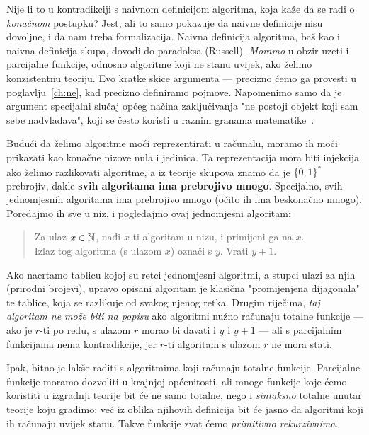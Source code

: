\begin{napomena}[{name=[Russellov paradoks s totalnim algoritmima]}]\label{nap:diagtot}
	Nije li to u kontradikciji s naivnom definicijom algoritma, koja kaže da se radi o \emph{konačnom} postupku? Jest, ali to samo pokazuje da naivne definicije nisu dovoljne, i da nam treba formalizacija. Naivna definicija algoritma, baš kao i naivna definicija skupa, dovodi do paradoksa (Russell). \emph{Moramo} u obzir uzeti i parcijalne funkcije, odnosno algoritme koji ne stanu uvijek, ako želimo konzistentnu teoriju. Evo kratke skice argumenta --- precizno ćemo ga provesti u poglavlju~\ref{ch:ne}, kad precizno definiramo pojmove. Napomenimo samo da je argument specijalni slučaj općeg načina zaključivanja "ne postoji objekt koji sam sebe nadvladava", koji se često koristi u raznim granama matematike~\cite{url:tao}.

Budući da želimo algoritme moći reprezentirati u računalu, moramo ih moći prikazati kao konačne nizove nula i jedinica. Ta reprezentacija mora biti injekcija ako želimo razlikovati algoritme, a iz teorije skupova znamo da je $\{0,1\}^*$ prebrojiv, dakle \textbf{svih algoritama ima prebrojivo mnogo}. Specijalno, svih jednomjesnih algoritama ima prebrojivo mnogo (očito ih ima beskonačno mnogo). Poredajmo ih sve u niz, i pogledajmo ovaj jednomjesni algoritam:
\begin{quote}
	Za ulaz $x\in{\mathbb N}$, nađi $x$-ti algoritam u nizu, i primijeni ga na $x$.\\
	Izlaz tog algoritma (s ulazom $x$) označi s $y$. Vrati $y+1$.
\end{quote}
	Ako nacrtamo tablicu kojoj su retci jednomjesni algoritmi, a stupci ulazi za njih (prirodni brojevi), upravo opisani algoritam je klasična "promijenjena dijagonala" te tablice, koja se razlikuje od svakog njenog retka. Drugim riječima, \emph{taj algoritam ne može biti na popisu} ako algoritmi nužno računaju totalne funkcije --- ako je $r$-ti po redu, s ulazom $r$ morao bi davati i $y$ i $y+1$ --- ali s parcijalnim funkcijama nema kontradikcije, jer $r$-ti algoritam s ulazom $r$ ne mora stati.
\end{napomena}

Ipak, bitno je lakše raditi s algoritmima koji računaju totalne funkcije. Parcijalne funkcije moramo dozvoliti u krajnjoj općenitosti, ali mnoge funkcije koje ćemo koristiti u izgradnji teorije bit će ne samo totalne, nego i \emph{sintaksno} totalne unutar teorije koju gradimo: već iz oblika njihovih definicija bit će jasno da algoritmi koji ih računaju uvijek stanu. Takve funkcije zvat ćemo \emph{primitivno rekurzivnima}.

